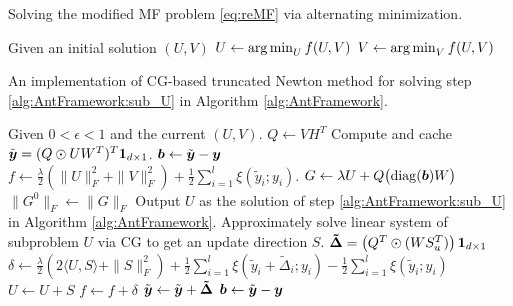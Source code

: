 \begin{algorithm}[t]
    \caption{Solving the modified MF problem \eqref{eq:reMF} via alternating minimization.}
    \label{alg:AntFramework}
    \begin{algorithmic}[1]
        \State Given an initial solution $(U, V)$
            \State $U   \gets \operatorname*{arg\,min}_{U} f(U,V)$ \label{alg:AntFramework:sub_U}
            \State $V   \gets \operatorname*{arg\,min}_{V} f(U,V)$
        \EndWhile
    \end{algorithmic}
\end{algorithm}

\begin{algorithm}
    \caption{An implementation of CG-based truncated Newton method for solving step \ref{alg:AntFramework:sub_U} in Algorithm \ref{alg:AntFramework}.}
    \label{alg:LrFrameworkU}
    \begin{algorithmic}[1]
        \State Given $0< \epsilon < 1$ and the current $(U,V)$.
        \State $Q \gets VH^T$ %
        \State Compute and cache $\tilde{\boldsymbol{y}}= (Q \odot UW^T)^T\boldsymbol{1}_{d\times 1}$.
        \State $\boldsymbol{b} \gets \tilde{\boldsymbol{y}} - \boldsymbol{y}$
        \State $f \gets \frac{\lambda}{2}(\|U\|_F^2 + \|V\|_F^2) + \frac{1}{2}\sum_{i=1}^l \xi(\tilde{y}_i;y_i)$.
            \State $G \gets \lambda U + Q \bigl(\operatorname*{diag}(\boldsymbol{b}) W \bigr)$
                \State $\|G^0\|_F \gets \|G\|_F$
            \EndIf
                \State Output $U$ as the solution of step \ref{alg:AntFramework:sub_U} in Algorithm \ref{alg:AntFramework}.
            \EndIf
            \State Approximately solve linear system of subproblem $U$ via CG to get an update direction $S$. \label{alg:LrFrameworkU:CG}
            \State $\boldsymbol{\tilde{\Delta}} = \left( Q^T \odot (WS_u^T) \right)\boldsymbol{1}_{d\times 1}$ %
            \State $\delta \gets \frac{\lambda}{2} \left( 2 \langle U, S \rangle + \|S\|_F^2 \right) + \frac{1}{2} \sum_{i=1}^l \xi(\tilde{y}_i+\tilde{\Delta}_i;y_i) - \frac{1}{2}\sum_{i=1}^l \xi(\tilde{y}_i;y_i)$
            \State $U \gets U + S$
            \State $f \gets f + \delta$
            \State $\tilde{\boldsymbol{y}} \gets \tilde{\boldsymbol{y}} + \boldsymbol{\tilde{\Delta}}$
            \State $\boldsymbol{b} \gets \tilde{\boldsymbol{y}} - \boldsymbol{y}$


\end{algorithmic}
\end{algorithm}
